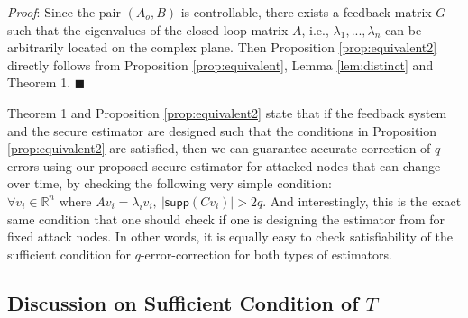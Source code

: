 \documentclass[../../thesis.tex]{subfiles}
\begin{document}
\textit{Proof}:
Since the pair $(A_o,B)$ is controllable, there exists a feedback matrix $G$ such that the eigenvalues of the closed-loop matrix $A$, i.e., $\lambda_1, ..., \lambda_n$ can be arbitrarily located on the complex plane. Then Proposition \ref{prop:equivalent2} directly follows from Proposition \ref{prop:equivalent}, Lemma \ref{lem:distinct} and Theorem 1. \hfill$\blacksquare$


Theorem 1 and Proposition \ref{prop:equivalent2} state that if the feedback system and the secure estimator are designed such that the conditions in Proposition \ref{prop:equivalent2} are satisfied, then we can guarantee accurate correction of $q$ errors using our proposed secure estimator for attacked nodes that can change over time, by checking the following very simple condition:
$ %
\forall v_i \in \mathbb{R}^n \text{ where } Av_i =\lambda_i v_i, ~ \lvert \textsf{supp}(Cv_i) \rvert > 2q.  \nonumber
$ %
And interestingly, this is the exact same condition that one should check if one is designing the estimator from \cite{Fawzi2014} for fixed attack nodes. In other words, it is equally easy to check satisfiability of the sufficient condition for $q$-error-correction for both types of estimators.

\subsection{Discussion on Sufficient Condition of $T$}
\end{document}
